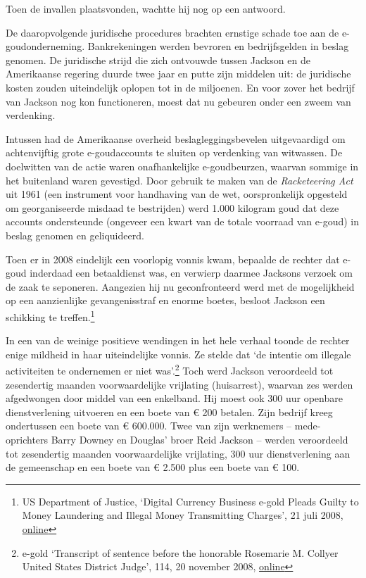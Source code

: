 \documentclass[
  a5paper,
  smalldemyvopaper,11pt,twoside,onecolumn,openright,extrafontsizes]{memoir}
\begin{document}
Toen de invallen plaatsvonden, wachtte hij nog op een antwoord.

De daaropvolgende juridische procedures brachten ernstige schade toe aan
de e-goudonderneming. Bankrekeningen werden bevroren en bedrijfsgelden
in beslag genomen. De juridische strijd die zich ontvouwde tussen
Jackson en de Amerikaanse regering duurde twee jaar en putte zijn
middelen uit: de juridische kosten zouden uiteindelijk oplopen tot in de
miljoenen. En voor zover het bedrijf van Jackson nog kon functioneren,
moest dat nu gebeuren onder een zweem van verdenking.

Intussen had de Amerikaanse overheid beslagleggingsbevelen uitgevaardigd
om achtenvijftig grote e-goudaccounts te sluiten op verdenking van
witwassen. De doelwitten van de actie waren onafhankelijke
e-goudbeurzen, waarvan sommige in het buitenland waren gevestigd. Door
gebruik te maken van de \emph{Racketeering Act} uit 1961 (een instrument
voor handhaving van de wet, oorspronkelijk opgesteld om georganiseerde
misdaad te bestrijden) werd 1.000 kilogram goud dat deze accounts
ondersteunde (ongeveer een kwart van de totale voorraad van e-goud) in
beslag genomen en geliquideerd.

Toen er in 2008 eindelijk een voorlopig vonnis kwam, bepaalde de rechter
dat e-goud inderdaad een betaaldienst was, en verwierp daarmee Jacksons
verzoek om de zaak te seponeren. Aangezien hij nu geconfronteerd werd
met de mogelijkheid op een aanzienlijke gevangenisstraf en enorme
boetes, besloot Jackson een schikking te treffen.\footnote{\hspace{0pt}US
  Department of Justice, `Digital Currency Business e-gold Pleads Guilty
  to Money Laundering and Illegal Money Transmitting Charges', 21 juli
  2008,
  \href{https://www.justice.gov/archive/opa/pr/2008/July/08-crm-635.html}{online}}

In een van de weinige positieve wendingen in het hele verhaal toonde de
rechter enige mildheid in haar uiteindelijke vonnis. Ze stelde dat `de
intentie om illegale activiteiten te ondernemen er niet was'.\footnote{\hspace{0pt}e-gold
  `Transcript of sentence before the honorable Rosemarie M. Collyer
  United States District Judge', 114, 20 november 2008,
  \href{https://legalupdate.e-gold.com/2008/11/transcript-of-sentence-before-the-honorable-rosemarie-m-collyer-united-states-district-judge.html}{online}}
Toch werd Jackson veroordeeld tot zesendertig maanden voorwaardelijke
vrijlating (huisarrest), waarvan zes werden afgedwongen door middel van
een enkelband. Hij moest ook 300 uur openbare dienstverlening uitvoeren
en een boete van € 200 betalen. Zijn bedrijf kreeg ondertussen een boete
van € 600.000. Twee van zijn werknemers -- mede-oprichters Barry Downey
en Douglas' broer Reid Jackson -- werden veroordeeld tot zesendertig
maanden voorwaardelijke vrijlating, 300 uur dienstverlening aan de
gemeenschap en een boete van € 2.500 plus een boete van € 100.
\end{document}
